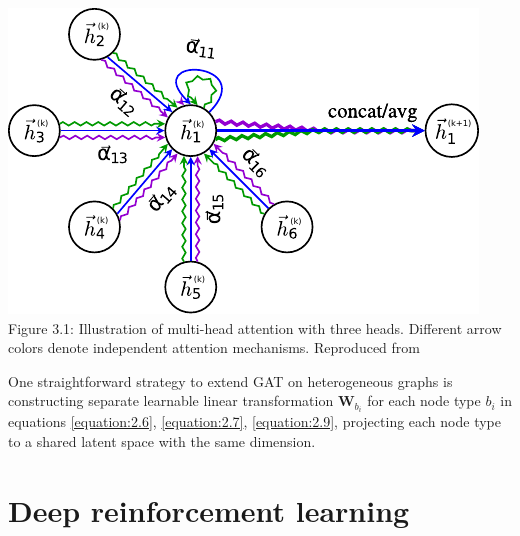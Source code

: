 \begin{center}
    \includegraphics[width=0.5\linewidth]{images/graph_attention_network_pdfa.pdf}\\
	Figure 3.1: Illustration of multi-head attention with three heads. Different arrow colors denote independent attention mechanisms. Reproduced from \cite{veličković2018graph}
\end{center}
\par
One straightforward strategy to extend GAT on heterogeneous graphs is constructing separate learnable linear transformation $\boldsymbol{W}_{b_i}$ for each node type $b_i$ in equations \ref{equation:2.6}, \ref{equation:2.7}, \ref{equation:2.9}, projecting each node type to a shared latent space with the same dimension.

\section{Deep reinforcement learning}

